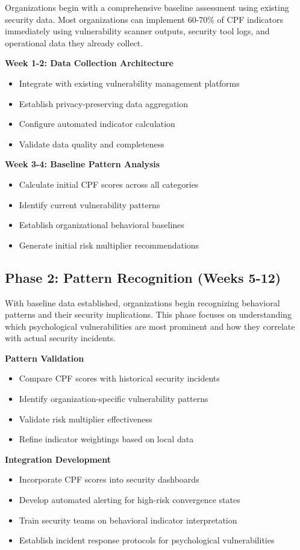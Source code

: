 \documentclass[11pt,a4paper]{article}
\begin{document}
Organizations begin with a comprehensive baseline assessment using existing security data. Most organizations can implement 60-70\% of CPF indicators immediately using vulnerability scanner outputs, security tool logs, and operational data they already collect.

\textbf{Week 1-2: Data Collection Architecture}
\begin{itemize}
\item Integrate with existing vulnerability management platforms
\item Establish privacy-preserving data aggregation
\item Configure automated indicator calculation
\item Validate data quality and completeness
\end{itemize}

\textbf{Week 3-4: Baseline Pattern Analysis}
\begin{itemize}
\item Calculate initial CPF scores across all categories
\item Identify current vulnerability patterns
\item Establish organizational behavioral baselines
\item Generate initial risk multiplier recommendations
\end{itemize}

\subsection{Phase 2: Pattern Recognition (Weeks 5-12)}

With baseline data established, organizations begin recognizing behavioral patterns and their security implications. This phase focuses on understanding which psychological vulnerabilities are most prominent and how they correlate with actual security incidents.

\textbf{Pattern Validation}
\begin{itemize}
\item Compare CPF scores with historical security incidents
\item Identify organization-specific vulnerability patterns
\item Validate risk multiplier effectiveness
\item Refine indicator weightings based on local data
\end{itemize}

\textbf{Integration Development}
\begin{itemize}
\item Incorporate CPF scores into security dashboards
\item Develop automated alerting for high-risk convergence states
\item Train security teams on behavioral indicator interpretation
\item Establish incident response protocols for psychological vulnerabilities
\end{itemize}
\end{document}
